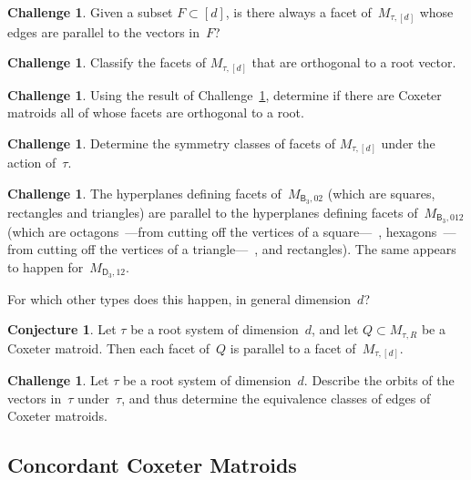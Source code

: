 \documentclass[11pt]{amsart}
\newcommand\BB{{\mathsf B}}
\newcommand\DD{{\mathsf D}}
\theoremstyle{definition}
\newtheorem{conjecture}[theorem]{Conjecture}
\newtheorem{challenge}[theorem]{Challenge}
\begin{document}
\begin{challenge}
  Given a subset $F\subset[d]$, is there always a facet of~$M_{\tau,[d]}$ whose edges are parallel to the vectors in~$F$?
\end{challenge}

\begin{challenge}\label{prob:facet-orthogonal-root}
  Classify the facets of $M_{\tau,[d]}$ that are orthogonal to a root vector.
\end{challenge}

\begin{challenge}
  Using the result of Challenge~\ref{prob:facet-orthogonal-root}, determine if there are Coxeter matroids all of whose facets are orthogonal to a root.
\end{challenge}

\begin{challenge}
  Determine the symmetry classes of facets of $M_{\tau,[d]}$ under the action of~$\tau$.
\end{challenge}

\begin{challenge}\label{prob:same-hyperplanes}
  The hyperplanes defining facets of~$M_{\BB_3,02}$ (which are squares, rectangles and triangles)
  are parallel to the hyperplanes defining facets of~$M_{\BB_3,012}$ (which are octagons~---from cutting off the vertices of a square---~,
  hexagons~---from cutting off the vertices of a triangle---~, and rectangles).
  The same appears to happen for~$M_{\DD_3,12}$.

  For which other types does this happen, in general dimension~$d$?
\end{challenge}

\begin{conjecture}
  Let $\tau$ be a root system of dimension~$d$, and let $Q\subset M_{\tau,R}$ be a Coxeter matroid.
  Then each facet of~$Q$ is parallel to a facet of~$M_{\tau,[d]}$.
\end{conjecture}

\begin{challenge}
  Let $\tau$ be a root system of dimension~$d$.
  Describe the orbits of the vectors in~$\tau$ under~$\tau$,
  and thus determine the equivalence classes of edges of Coxeter matroids.
\end{challenge}


\subsection{Concordant Coxeter Matroids}
\end{document}
